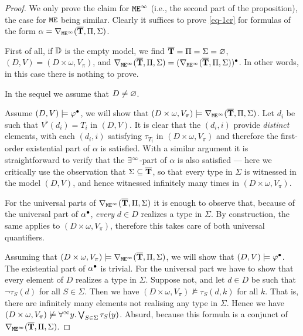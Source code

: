 \begin{proof}
We only prove the claim for $\mathtt{M}\mathtt{E}^{\infty}$ (i.e., the second part of the proposition),
the case for $\mathtt{M}\mathtt{E}$ being similar.
Clearly it suffices to prove \eqref{eq-1cr} for formulas of the form
$\alpha = \nabla_{\mathtt{M}\mathtt{E}^{\infty}}(\overline{{\mathbf{T}}},\Pi,\Sigma)$.

First of all, if $\mathbb{D}$ is the empty model, we find ${\overline{{\mathbf{T}}}}={\Pi} = 
{\Sigma} = \varnothing$, $(D, V) = (D\times \omega, V_\pi)$, and
$\nabla_{\mathtt{M}\mathtt{E}^{\infty}}(\overline{{\mathbf{T}}},\Pi,\Sigma) = 
(\nabla_{\mathtt{M}\mathtt{E}^{\infty}}(\overline{{\mathbf{T}}},\Pi,\Sigma))^\bullet$. 
In other words, in this case there is nothing to prove.
\smallskip

In the sequel we assume that $D \neq \varnothing$.

\noindent\fbox{$\Rightarrow$} 
Assume $(D, V) \models \varphi^{\bullet}$, we will show that 
$(D\times \omega, V_\pi) \models \nabla_{\mathtt{M}\mathtt{E}^{\infty}}(\overline{{\mathbf{T}}},\Pi,\Sigma)$.
Let $d_i$ be such that $V^{\flat}(d_i) = T_{i}$ in $(D, V)$. 
It is clear that the $(d_i,i)$ provide \emph{distinct} elements, with each 
$(d_i,i)$ satisfying $\tau_{T_i}$ in $(D\times\omega, V_{\pi})$ and therefore 
the first-order existential part of $\alpha$ is satisfied. 
With a similar argument it is straightforward to verify that the $\exists^\infty$-part of 
$\alpha$ is also satisfied --- here we critically use the observation that
$\Sigma \subseteq \overline{{\mathbf{T}}}$, so that every type in $\Sigma$ is witnessed in 
the model $(D,V)$, and hence witnessed infinitely many times in $(D\times\omega,
V_\pi)$.

For the universal parts of $\nabla_{\mathtt{M}\mathtt{E}^{\infty}}(\overline{{\mathbf{T}}},\Pi,\Sigma)$ it is enough
to observe that, because of the universal part of $\alpha^\bullet$, \emph{every}
$d\in D$ realizes a type in $\Sigma$. 
By construction, the same applies to $(D\times\omega, V_{\pi})$, 
therefore this takes care of both universal quantifiers.
\medskip
		
\noindent\fbox{$\Leftarrow$} 
Assuming that $(D\times \omega, V_\pi) \models 
\nabla_{\mathtt{M}\mathtt{E}^{\infty}}(\overline{{\mathbf{T}}},\Pi,\Sigma)$,
we will show that $(D, V) \models \varphi^\bullet$. 
The existential part of $\alpha^{\bullet}$ is trivial. 
For the universal part we have to show that every element of $D$ realizes a 
type in $\Sigma$. 
Suppose not, and let $d\in D$ be such that $\lnot\tau_S(d)$ for all $S\in 
\Sigma$. 
Then we have $(D\times\omega, V_\pi) \not\models \tau_S(d,k)$ for all $k$.
That is, there are infinitely many elements not realising any type in $\Sigma$. 
Hence we have $(D\times\omega, V_\pi) \not\models \forall^\infty y.\bigvee_{S\in\Sigma} 
\tau_S(y)$. 
Absurd, because this formula is a conjunct of 
$\nabla_{\mathtt{M}\mathtt{E}^{\infty}}(\overline{{\mathbf{T}}},\Pi,\Sigma)$.
\end{proof}

